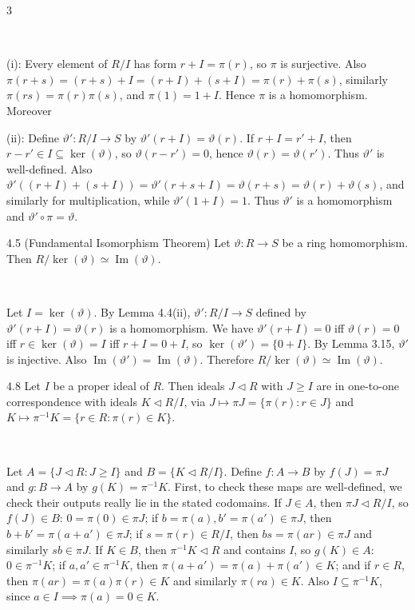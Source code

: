 \documentclass[8pt]{extarticle}
\makeatletter
\newcommand{\fitdisplay}[1]{%
  \par\vspace{-1pt}\noindent
  \sbox{\fitdisplaybox}{#1}%
  \makebox[\columnwidth][c]{%
    \ifdim\wd\fitdisplaybox>\columnwidth
      \resizebox{\columnwidth}{!}{#1}%
    \else
      \usebox{\fitdisplaybox}%
    \fi
  }%
  \par\vspace{-1pt}%
}
\renewenvironment{proof}[1][\proofname]{%
  \begin{tcolorbox}[proofpairboxstyle]%
  \pushQED{\qed}%
  \normalfont\itshape #1\@addpunct{.}\ \normalfont\ignorespaces
}{%
  \popQED%
  \end{tcolorbox}%
}
\makeatother
\begin{document}
\begin{multicols*}{3}
        \begin{proof}
            (i): Every element of \(R/I\) has form \(r+I=\pi(r)\), so \(\pi\) is surjective. Also \(\pi(r+s)=(r+s)+I=(r+I)+(s+I)=\pi(r)+\pi(s)\), similarly \(\pi(rs)=\pi(r)\pi(s)\), and \(\pi(1)=1+I\). Hence \(\pi\) is a homomorphism. Moreover
            \fitdisplay{\(\ker(\pi)=\{r\in R:\pi(r)=0+I\}=\{r\in R:r+I=I\}=I.\)}

            (ii): Define \(\vartheta':R/I\to S\) by \(\vartheta'(r+I)=\vartheta(r)\). If \(r+I=r'+I\), then \(r-r'\in I\subseteq\ker(\vartheta)\), so \(\vartheta(r-r')=0\), hence \(\vartheta(r)=\vartheta(r')\). Thus \(\vartheta'\) is well-defined. Also \(\vartheta'((r+I)+(s+I))=\vartheta'(r+s+I)=\vartheta(r+s)=\vartheta(r)+\vartheta(s)\), and similarly for multiplication, while \(\vartheta'(1+I)=1\). Thus \(\vartheta'\) is a homomorphism and \(\vartheta'\circ\pi=\vartheta\).
        \end{proof}

        \begin{theorem}{4.5}
            (Fundamental Isomorphism Theorem) Let \(\vartheta:R\to S\) be a ring homomorphism. Then \(R/\ker(\vartheta)\simeq\operatorname{Im}(\vartheta)\).
        \end{theorem}

        \begin{proof}
            Let \(I=\ker(\vartheta)\). By Lemma 4.4(ii), \(\vartheta':R/I\to S\) defined by \(\vartheta'(r+I)=\vartheta(r)\) is a homomorphism. We have \(\vartheta'(r+I)=0\) iff \(\vartheta(r)=0\) iff \(r\in\ker(\vartheta)=I\) iff \(r+I=0+I\), so \(\ker(\vartheta')=\{0+I\}\). By Lemma 3.15, \(\vartheta'\) is injective. Also \(\operatorname{Im}(\vartheta')=\operatorname{Im}(\vartheta)\). Therefore \(R/\ker(\vartheta)\simeq\operatorname{Im}(\vartheta)\).
        \end{proof}

        \begin{theorem}{4.8}
            Let \(I\) be a proper ideal of \(R\). Then ideals \(J\lhd R\) with \(J\ge I\) are in one-to-one correspondence with ideals \(K\lhd R/I\), via \(J\mapsto\pi J=\{\pi(r):r\in J\}\) and \(K\mapsto\pi^{-1}K=\{r\in R:\pi(r)\in K\}\).
        \end{theorem}

        \begin{proof}
            Let \(A=\{J\lhd R:J\ge I\}\) and \(B=\{K\lhd R/I\}\). Define \(f:A\to B\) by \(f(J)=\pi J\) and \(g:B\to A\) by \(g(K)=\pi^{-1}K\). First, to check these maps are well-defined, we check their outputs really lie in the stated codomains. If \(J\in A\), then \(\pi J\lhd R/I\), so \(f(J)\in B\): \(0=\pi(0)\in\pi J\); if \(b=\pi(a),b'=\pi(a')\in\pi J\), then \(b+b'=\pi(a+a')\in\pi J\); if \(s=\pi(r)\in R/I\), then \(bs=\pi(ar)\in\pi J\) and similarly \(sb\in\pi J\). If \(K\in B\), then \(\pi^{-1}K\lhd R\) and contains \(I\), so \(g(K)\in A\): \(0\in\pi^{-1}K\); if \(a,a'\in\pi^{-1}K\), then \(\pi(a+a')=\pi(a)+\pi(a')\in K\); and if \(r\in R\), then \(\pi(ar)=\pi(a)\pi(r)\in K\) and similarly \(\pi(ra)\in K\). Also \(I\subseteq\pi^{-1}K\), since \(a\in I\implies\pi(a)=0\in K\).


\end{proof}
\end{multicols*}
\end{document}
